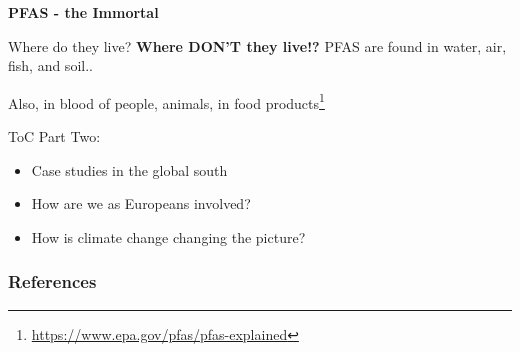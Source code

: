 \documentclass{beamer}
\begin{document}
\begin{frame}

    \Huge\bf
    \textcolor{msred}{
    PFAS - the Immortal}

\end{frame}

\begin{frame}{Where do they live?}
    \textbf{Where DON'T they live!?}
    PFAS are found in water, air, fish, and soil..\pause

    Also, in blood of people, animals, in food
    products\footnote{\url{https://www.epa.gov/pfas/pfas-explained}}

\end{frame}

\begin{frame}{ToC}
    \Large{Part Two:}
    \begin{itemize}
        \item Case studies in the global south
        \item How are we as Europeans involved?
        \item How is climate change changing the picture?
    \end{itemize}
\end{frame}

\appendix
\begin{frame}[allowframebreaks]
    \frametitle{References}
    
    
\end{frame}
\end{document}
